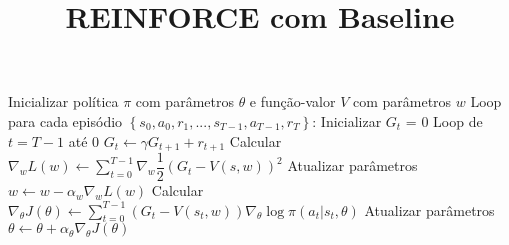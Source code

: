 \documentclass[brazilian,preview]{standalone}
\title{REINFORCE com Baseline}
\begin{document}
\begin{algorithm}
Inicializar política $\pi$ com parâmetros $\theta$ e função-valor $V$ com parâmetros $w$
Loop para cada episódio $\left\{s_0, a_0, r_1, ..., s_{T-1}, a_{T-1}, r_T \right\}$:
    Inicializar $G_t$ = 0
    Loop de $t = T-1$ até $0$
        $G_t \leftarrow \gamma G_{t+1} + r_{t+1}$
    Calcular $\nabla_w L\left(w\right) \leftarrow \sum\limits_{t=0}^{T-1} \nabla_w \dfrac{1}{2}\left(G_t - V(s, w)\right)^2$
    Atualizar parâmetros $w \leftarrow w - \alpha_w \nabla_w L\left(w\right)$
    Calcular $\nabla_\theta J\left(\theta\right) \leftarrow \sum\limits_{t=0}^{T-1} \left(G_t - V(s_t, w) \right) \nabla_{\theta}\log \pi\left(a_t| s_t, \theta\right)$
    Atualizar parâmetros $\theta \leftarrow \theta + \alpha_\theta \nabla_\theta J\left(\theta\right)$
\end{algorithm}
\end{document}
